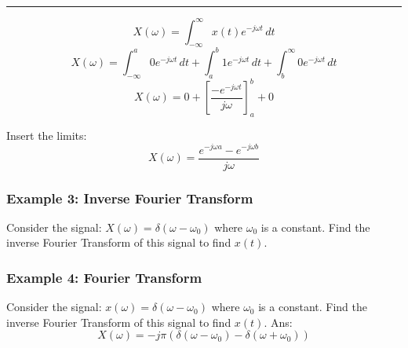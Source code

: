 \rule{\textwidth}{0.5pt}
$$X(\omega)=\int_{-\infty}^{\infty}x(t)e^{ -j\omega t }  \, dt $$
$$X(\omega)=\int_{-\infty}^{a}0e^{ -j\omega t }  \, dt +\int_{a}^{b}1e^{ -j\omega t }  \, dt +\int_{b}^{\infty}0e^{ -j\omega t }  \, dt $$
$$X(\omega)=0+\left[\frac{-e^{-j\omega t}}{j\omega} \right]_a^b+0$$

Insert the limits:
$$X(\omega)=\frac{e^{-j\omega a}-e^{-j\omega b}}{j\omega}$$
\subsubsection{Example 3: Inverse Fourier Transform}
Consider the signal: $X(\omega)=\delta(\omega-\omega_0)$ where $\omega_{0}$ is a constant. Find the inverse Fourier Transform of this signal to find $x(t)$.


\subsubsection{Example 4: Fourier Transform}
Consider the signal: $x(\omega)=\delta(\omega-\omega_0)$ where $\omega_{0}$ is a constant. Find the inverse Fourier Transform of this signal to find $x(t)$.
Ans:
$$X(\omega)=-j\pi(\delta(\omega-\omega_0)-\delta(\omega+\omega_0))$$

